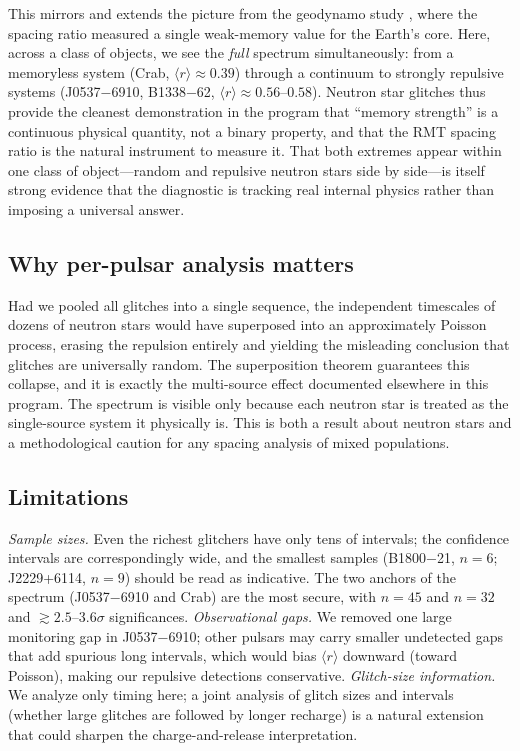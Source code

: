 \documentclass[12pt,a4paper]{article}
\begin{document}
This mirrors and extends the picture from the geodynamo study \citep{chen2026geomag}, where the spacing ratio measured a single weak-memory value for the Earth's core. Here, across a class of objects, we see the \emph{full} spectrum simultaneously: from a memoryless system (Crab, $\langle r\rangle\approx0.39$) through a continuum to strongly repulsive systems (J0537$-$6910, B1338$-$62, $\langle r\rangle\approx0.56$--$0.58$). Neutron star glitches thus provide the cleanest demonstration in the program that ``memory strength'' is a continuous physical quantity, not a binary property, and that the RMT spacing ratio is the natural instrument to measure it. That both extremes appear within one class of object---random and repulsive neutron stars side by side---is itself strong evidence that the diagnostic is tracking real internal physics rather than imposing a universal answer.

\subsection{Why per-pulsar analysis matters}

Had we pooled all glitches into a single sequence, the independent timescales of dozens of neutron stars would have superposed into an approximately Poisson process, erasing the repulsion entirely and yielding the misleading conclusion that glitches are universally random. The superposition theorem guarantees this collapse, and it is exactly the multi-source effect documented elsewhere in this program. The spectrum is visible only because each neutron star is treated as the single-source system it physically is. This is both a result about neutron stars and a methodological caution for any spacing analysis of mixed populations.

\subsection{Limitations}

\emph{Sample sizes.} Even the richest glitchers have only tens of intervals; the confidence intervals are correspondingly wide, and the smallest samples (B1800$-$21, $n=6$; J2229+6114, $n=9$) should be read as indicative. The two anchors of the spectrum (J0537$-$6910 and Crab) are the most secure, with $n=45$ and $n=32$ and $\gtrsim2.5$--$3.6\sigma$ significances. \emph{Observational gaps.} We removed one large monitoring gap in J0537$-$6910; other pulsars may carry smaller undetected gaps that add spurious long intervals, which would bias $\langle r\rangle$ downward (toward Poisson), making our repulsive detections conservative. \emph{Glitch-size information.} We analyze only timing here; a joint analysis of glitch sizes and intervals (whether large glitches are followed by longer recharge) is a natural extension that could sharpen the charge-and-release interpretation.
\end{document}
